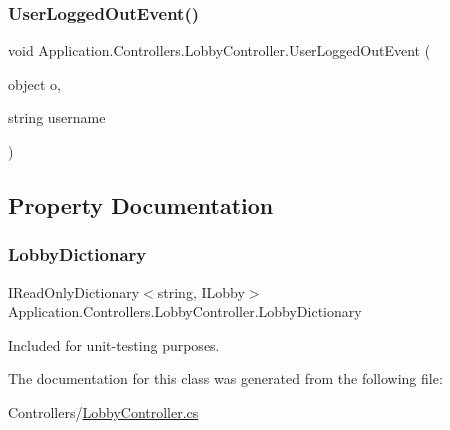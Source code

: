 \subsubsection{\texorpdfstring{User\+Logged\+Out\+Event()}{UserLoggedOutEvent()}}
{\footnotesize\ttfamily void Application.\+Controllers.\+Lobby\+Controller.\+User\+Logged\+Out\+Event (\begin{DoxyParamCaption}\item[{object}]{o,  }\item[{string}]{username }\end{DoxyParamCaption})}



\subsection{Property Documentation}
\mbox{\label{class_application_1_1_controllers_1_1_lobby_controller_adb1b5081f64dfe91e33d00b402632ec4}} 
\subsubsection{\texorpdfstring{Lobby\+Dictionary}{LobbyDictionary}}
{\footnotesize\ttfamily I\+Read\+Only\+Dictionary$<$string, I\+Lobby$>$ Application.\+Controllers.\+Lobby\+Controller.\+Lobby\+Dictionary\hspace{0.3cm}{\ttfamily [get]}}



Included for unit-\/testing purposes. 



The documentation for this class was generated from the following file\+:\begin{DoxyCompactItemize}
\item 
Controllers/\mbox{\hyperlink{_lobby_controller_8cs}{Lobby\+Controller.\+cs}}\end{DoxyCompactItemize}
